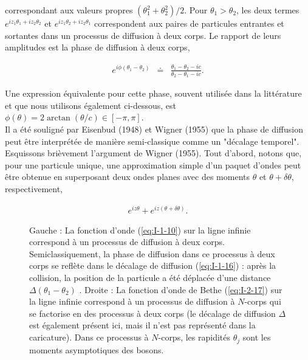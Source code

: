 correspondant aux valeurs propres $(\theta_1^2 + \theta_2^2)/2$. Pour $\theta_1 > \theta_2$, les deux termes $e^{iz_1 \theta_1 + iz_2 \theta_2 }$ et $e^{iz_1 \theta_2 + iz_2 \theta_1 }$ correspondent aux paires de particules entrantes et sortantes dans un processus de diffusion à deux corps. Le rapport de leurs amplitudes est la phase de diffusion à deux corps,

\begin{eqnarray}\label{eq:I-1-11}
	e^{i\phi ( \theta_1 - \theta_2 ) } & \doteq & \frac{\theta_1 - \theta_2 - ic} { \theta_2 - \theta_1 - ic}. 
\end{eqnarray}

Une expression équivalente pour cette phase, souvent utilisée dans la littérature et que nous utilisons également ci-dessous, est $\phi ( \theta ) = 2 \arctan ( \theta/c) \in [ - \pi , \pi ] $.\\

Il a été souligné par {\color{blue}Eisenbud (1948)} et {\color{blue}Wigner (1955)} que la phase de diffusion peut être interprétée de manière semi-classique comme un "décalage temporel". Esquissons brièvement l'argument de {\color{blue}Wigner (1955)}. Tout d'abord, notons que, pour une particule unique, une approximation simple d'un paquet d'ondes peut être obtenue en superposant deux ondes planes avec des moments $\theta$ et $\theta + \delta \theta $, respectivement,

\begin{eqnarray}
	e^{iz \theta } + e^{ i z ( \theta + \delta \theta )}.
\end{eqnarray}

\begin{figure}[H]
	\centering
  \caption{Gauche : La fonction d'onde (\ref{eq:I-1-10}) sur la ligne infinie correspond à un processus de diffusion à deux corps. Semiclassiquement, la phase de diffusion dans ce processus à deux corps se reflète dans le décalage de diffusion (\ref{eq:I-1-16}) : après la collision, la position de la particule a été déplacée d'une distance $\Delta ( \theta_1 - \theta_2 )$ . Droite : La fonction d'onde de Bethe (\ref{eq:I-2-17}) sur la ligne infinie correspond à un processus de diffusion à $N$-corps qui se factorise en des processus à deux corps (le décalage de diffusion $\Delta$ est également présent ici, mais il n'est pas représenté dans la caricature). Dans ce processus à $N$-corps, les rapidités $\theta_j$ sont les moments asymptotiques des bosons.}
  \label{}	
\end{figure}

